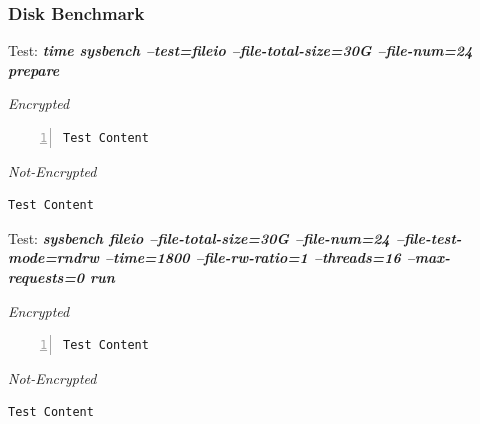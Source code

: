 \subsubsection{Disk Benchmark}
\begin{center}
  Test: \textbf{\textit{time sysbench --test=fileio --file-total-size=30G --file-num=24 prepare}}  
\end{center}
\vspace*{-\baselineskip}
\noindent\begin{minipage}[t]{0.45\linewidth}
  \centering
  \textit{Encrypted}
  \lstset{language=bash,label=SliceExaple}
  \begin{lstlisting}[basicstyle=\tiny,frame=single, numbers=left, label=cpu_test1]
  Test Content
  \end{lstlisting}
\end{minipage}
\hspace{0.5cm}
\noindent\begin{minipage}[t]{0.45\linewidth}
  \centering
  \textit{Not-Encrypted}
  \begin{lstlisting}[basicstyle=\tiny,frame=single, label=cpu_test2]
  Test Content
  \end{lstlisting}
\end{minipage}

\newpage
\begin{center}
  Test: \textbf{\textit{sysbench fileio --file-total-size=30G --file-num=24 --file-test-mode=rndrw --time=1800 --file-rw-ratio=1 --threads=16 --max-requests=0 run}}  
\end{center}
\vspace*{-\baselineskip}
\noindent\begin{minipage}[t]{0.45\linewidth}
  \centering
  \textit{Encrypted}
  \lstset{language=bash,label=SliceExaple}
  \begin{lstlisting}[basicstyle=\tiny,frame=single, numbers=left, label=cpu_test1]
  Test Content
  \end{lstlisting}
\end{minipage}
\hspace{0.5cm}
\noindent\begin{minipage}[t]{0.45\linewidth}
  \centering
  \textit{Not-Encrypted}
  \begin{lstlisting}[basicstyle=\tiny,frame=single, label=cpu_test2]
  Test Content
  \end{lstlisting}
\end{minipage}



